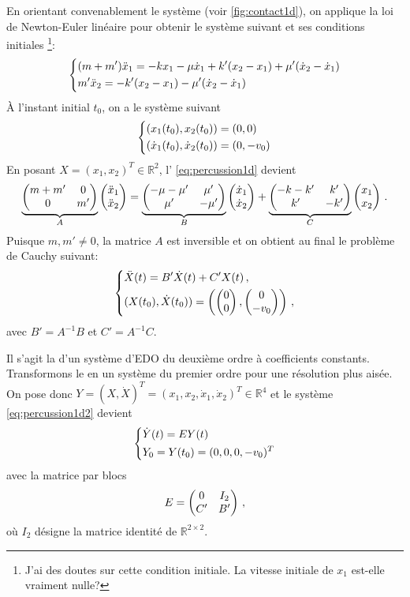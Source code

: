 \noindent En orientant convenablement le système (voir \cref{fig:contact1d}), on applique la loi de Newton-Euler linéaire
pour obtenir le système suivant et ses conditions initiales \footnote{J'ai des doutes sur cette condition
initiale. La vitesse initiale de $x_1$ est-elle vraiment nulle?}:
\begin{align}
    \begin{dcases}
    (m+m')\ddot x_1 = -kx_1 - \mu \dot x_1 + k'(x_2 - x_1) + \mu'(\dot x_2 - \dot x_1) \\
        m' \ddot x_2 =  -k'(x_2 - x_1) - \mu'(\dot x_2 - \dot x_1) 
    \end{dcases}
\end{align}
À l'instant initial $t_0$, on a le système suivant
\begin{align} \label{eq:percussion1d}
    \begin{dcases}
    (x_1(t_0), x_2(t_0)) = (0,0) \\
    (\dot x_1(t_0), \dot x_2(t_0)) = (0,-v_0)
    \end{dcases}
\end{align}
En posant $X = (x_1, x_2)^T \in \mathbb{R}^2$, l' \cref{eq:percussion1d} devient
\begin{align}
    \underbrace{\begin{pmatrix} m+m' & 0 \\ 0 & m' \end{pmatrix}}_{A} \begin{pmatrix} \ddot{x}_1 \\ \ddot{x}_2 \end{pmatrix} = \underbrace{\begin{pmatrix} -\mu -
    \mu^\prime & \mu' \\ \mu' & -\mu' \end{pmatrix}}_{B}
    \begin{pmatrix} \dot{x}_1 \\ \dot{x}_2 \end{pmatrix} + \underbrace{\begin{pmatrix} -k-k' & k' \\ k' & -k' \end{pmatrix}}_{C} \begin{pmatrix} x_1 \\ x_2 \end{pmatrix} \,.
\end{align}
Puisque $m, m'\neq 0$, la matrice $A$ est inversible et on obtient au final le problème de Cauchy suivant:
\begin{align} \label{eq:percussion1d2}
    \begin{dcases}
        \ddot{X}(t) = B' \dot{X}(t) + C'X(t) \,, \\
        (X(t_0), \dot X (t_0)) = \left( \begin{pmatrix} 0 \\ 0 \end{pmatrix}, \begin{pmatrix} 0 \\ -v_0 \end{pmatrix} \right) \,,
    \end{dcases}
\end{align}
avec $B' = A^{-1}B$ et $C' = A^{-1}C$.

\noindent Il s'agit la d'un système d'EDO du deuxième ordre à coefficients constants. Transformons le en un système du premier ordre pour
une résolution plus aisée. On pose donc $Y= (X, \dot X)^T = (x_1, x_2, \dot{x}_1, \dot{x}_2)^T \in \mathbb{R}^4$ et le
système
\ref{eq:percussion1d2}
devient
\begin{align} \label{eq:systeme1d}
    \begin{dcases}
        \dot{Y}(t)= E Y(t) \\
        Y_0 = Y(t_0) = (0,0,0,-v_0)^T
    \end{dcases}
\end{align}
avec la matrice par blocs \[ E = \begin{pmatrix} 0 & I_2 \\ C' & B' \end{pmatrix} \,, \] où $I_2$ désigne la matrice identité de
$\mathbb{R}^{2\times2}$.

